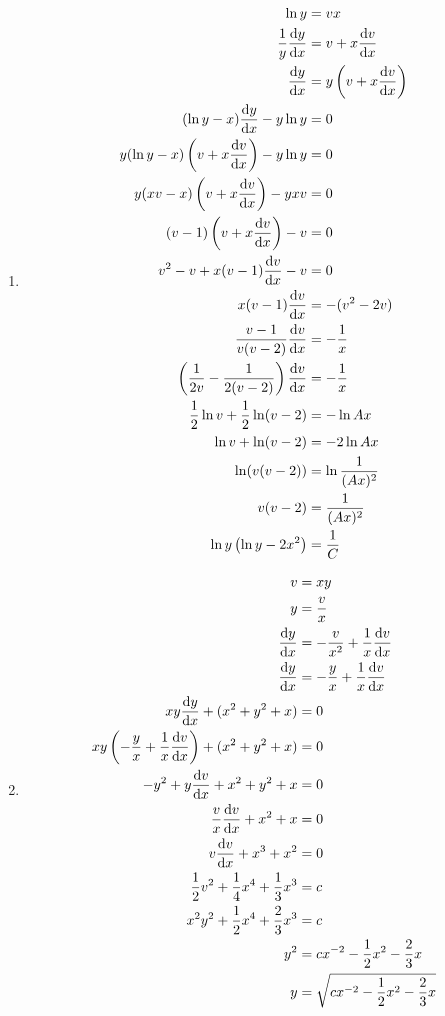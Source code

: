 \documentclass[10pt,\jkfside,a4paper]{article}
\begin{document}
\begin{enumerate}
\begin{enumerate}
\item
\begin{equation}
\begin{split}
\ln y &= vx\\
\frac{1}{y}\dv{y}{x} &= v + x\dv{v}{x}\\
\dv{y}{x} &= y\left(v + x\dv{v}{x}\right)\\
(\ln y - x)\dv{y}{x} - y\ln y &= 0\\
y(\ln y - x)\left(v + x\dv{v}{x}\right) - y\ln y &= 0\\
y(xv - x)\left(v + x\dv{v}{x}\right) - yxv &= 0\\
(v - 1)\left(v + x\dv{v}{x}\right) - v &= 0\\
v^2 - v + x(v - 1)\dv{v}{x} - v &= 0\\
x(v - 1)\dv{v}{x} &= -(v^2 - 2v)\\
\frac{v - 1}{v(v - 2)}\dv{v}{x} &= -\frac{1}{x}\\
\left(\frac{1}{2v} - \frac{1}{2(v - 2)}\right)\dv{v}{x} &= -\frac{1}{x}\\
\frac{1}{2}\ln v + \frac{1}{2}\ln (v - 2) &= -\ln Ax\\
\ln v + \ln (v - 2) &= -2 \ln Ax\\
\ln (v(v - 2)) &= \ln \frac{1}{(Ax)^2}\\
v(v - 2) &= \frac{1}{(Ax)^2}\\
\ln y\left(\ln y - 2x^2\right) &= \frac{1}{C}\\
\end{split}
\end{equation}

\item
\begin{equation}
\begin{split}
v &= xy\\
y &= \frac{v}{x}\\
\dv{y}{x} &= -\frac{v}{x^2} + \frac{1}{x}\dv{v}{x}\\
\dv{y}{x} &= -\frac{y}{x} + \frac{1}{x}\dv{v}{x}\\
xy\dv{y}{x} + (x^2 + y^2 + x) &= 0\\
xy\left(-\frac{y}{x} + \frac{1}{x}\dv{v}{x}\right) + (x^2 + y^2 + x) &= 0\\
-y^2 + y\dv{v}{x} + x^2 + y^2 + x &= 0\\
\frac{v}{x}\dv{v}{x} + x^2 + x &= 0\\
v\dv{v}{x} + x^3 + x^2 &= 0\\
\frac{1}{2}v^2 + \frac{1}{4}x^4 + \frac{1}{3}x^3 &= c\\
x^2y^2 + \frac{1}{2}x^4 + \frac{2}{3}x^3 &= c\\
y^2 &= cx^{-2} - \frac{1}{2}x^2 - \frac{2}{3}x\\
y &= \sqrt{cx^{-2} - \frac{1}{2}x^2 - \frac{2}{3}x}\\
\end{split}
\end{equation}

\end{enumerate}

\end{enumerate}
\end{document}
